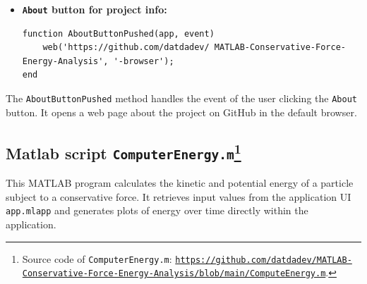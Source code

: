 \documentclass[13pt,a4paper]{report}
\begin{document}
\begin{itemize}[leftmargin=*,itemindent=0.1cm]
\begin{verbatim}
|\setcounter{FancyVerbLine}{75}|function PECheckBoxValueChanged(app, event)
    if ~app.PECheckBox.Value && ~app.KECheckBox.Value
        app.PECheckBox.Value = true;
        errordlg('At least one of the two checkboxes should be activated!', 'Warning', 'modal');
    elseif length(app.UIAxes.Children) == 2
        if app.PECheckBox.Value
            set(app.UIAxes.Children(1), 'Visible', 'on');
        else
            set(app.UIAxes.Children(1), 'Visible', 'off');
        end
    end
end
    \end{verbatim}
The callback functions \texttt{KECheckBoxValueChanged} and \texttt{PECheckBoxValueChanged} are associated with the \texttt{kinetic energy checkbox} and \texttt{potential energy checkbox}, respectively. These functions check whether at least one of the checkboxes is activated. If neither checkbox is activated, the function activates one of them and displays a warning message. Otherwise, the function adjusts the visibility of the plot based on the checkbox value.

    \newpage
    \item \textbf{\texttt{About} button for project info:}
    \begin{verbatim}
function AboutButtonPushed(app, event)
    web('https://github.com/datdadev/ MATLAB-Conservative-Force-Energy-Analysis', '-browser');
end
    \end{verbatim}
\end{itemize}
The \texttt{AboutButtonPushed} method handles the event of the user clicking the \texttt{About} button. It opens a web page about the project on GitHub in the default browser.

\subsection{Matlab script \texttt{ComputerEnergy.m}\protect\footnote[7]{Source code of \texttt{ComputerEnergy.m}: \texttt{\url{https://github.com/datdadev/MATLAB-Conservative-Force-Energy-Analysis/blob/main/ComputeEnergy.m}}.}}

This MATLAB program calculates the kinetic and potential energy of a particle subject to a conservative force. It retrieves input values from the application UI \texttt{app.mlapp} and generates plots of energy over time directly within the application.
\end{document}
